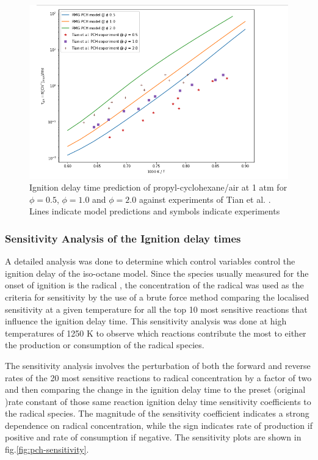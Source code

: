\begin{figure}[!htp]
    \centering
    \includegraphics[scale=0.4, keepaspectratio]{images/pch-model-idt.png}
    \caption{Ignition delay time prediction of propyl-cyclohexane/air at 1 atm for $\phi=0.5$, $\phi=1.0$ and $\phi=2.0$ against experiments of Tian et al. \cite{Tian2014ComparativeN-Propylcyclohexane}. Lines indicate model predictions and symbols indicate experiments}
    \label{fig:pch-idt}
\end{figure}


\subsubsection{Sensitivity Analysis of the Ignition delay times}
A detailed analysis was done to determine which control variables control the ignition delay of the iso-octane model. Since the species usually measured for the onset of ignition is the  radical \cite{Ji2019EvolutionAutoignition}, the concentration of the  radical was used as the criteria for sensitivity by the use of a brute force method comparing the localised sensitivity at a given temperature for all the top 10 most sensitive reactions that influence the ignition delay time. This sensitivity analysis was done at high temperatures of 1250 K to observe which reactions contribute the most to either the production or consumption of the  radical species. 

The sensitivity analysis involves the perturbation of both the forward and reverse rates of the 20 most sensitive reactions to  radical concentration by a factor of two and then comparing the change in the ignition delay time to the preset (original )rate constant of those same reaction ignition delay time sensitivity coefficients to the  radical species. The magnitude of the sensitivity coefficient indicates a strong dependence on  radical concentration, while the sign indicates rate of production if positive and rate of consumption if negative. The sensitivity plots are shown in fig.\ref{fig:pch-sensitivity}.

